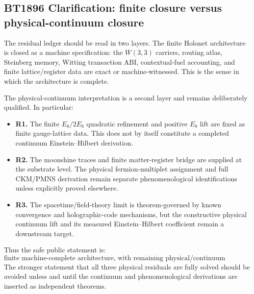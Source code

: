 
\subsection*{BT1896 Clarification: finite closure versus physical-continuum closure}

The residual ledger should be read in two layers.  The finite Holonet architecture is closed as a
machine specification: the $W(3,3)$ carriers, routing atlas, Steinberg memory, Witting transaction
ABI, contextual-fuel accounting, and finite lattice/register data are exact or machine-witnessed.
This is the sense in which the architecture is complete.

The physical-continuum interpretation is a second layer and remains deliberately qualified.  In
particular:

\begin{itemize}
\item \textbf{R1.}  The finite $E_8/2E_8$ quadratic refinement and positive $E_8$ lift are fixed as
finite gauge-lattice data.  This does not by itself constitute a completed continuum
Einstein--Hilbert derivation.
\item \textbf{R2.}  The moonshine traces and finite matter-register bridge are supplied at the
substrate level.  The physical fermion-multiplet assignment and full CKM/PMNS derivation remain
separate phenomenological identifications unless explicitly proved elsewhere.
\item \textbf{R3.}  The spacetime/field-theory limit is theorem-governed by known convergence and
holographic-code mechanisms, but the constructive physical continuum lift and its measured
Einstein--Hilbert coefficient remain a downstream target.
\end{itemize}

Thus the safe public statement is:
\[
\text{finite machine-complete architecture, with remaining physical/continuum identifications classified.}
\]
The stronger statement that all three physical residuals are fully solved should be avoided unless
and until the continuum and phenomenological derivations are inserted as independent theorems.
